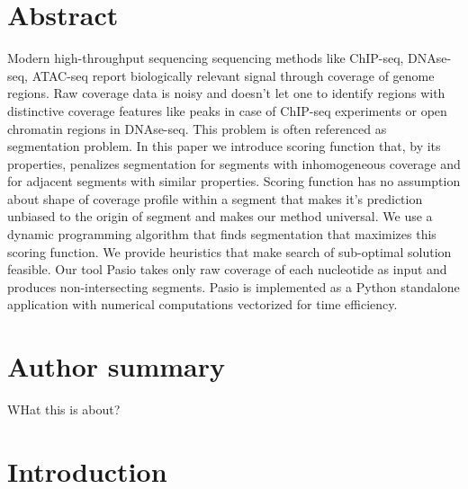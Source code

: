 \documentclass[10pt,letterpaper]{article}
\begin{document}
\section*{Abstract}
Modern high-throughput sequencing sequencing methods like ChIP-seq, DNAse-seq, ATAC-seq report biologically relevant signal
through coverage of genome regions. 
Raw coverage data is noisy and doesn't let one to identify regions with distinctive coverage features like peaks in case of ChIP-seq experiments or open chromatin regions in DNAse-seq. This problem is often referenced as segmentation problem.
In this paper we introduce scoring function that, by its properties,
penalizes segmentation for segments with inhomogeneous coverage and for adjacent segments with similar properties.
Scoring function has no assumption about shape of coverage profile within a segment that makes it's prediction unbiased to the origin of segment and
makes our method universal.
We use a dynamic programming algorithm that finds segmentation that maximizes this scoring function.
We provide heuristics that make search of sub-optimal solution feasible.
Our tool Pasio takes only raw coverage of each nucleotide as input and produces non-intersecting segments.
Pasio is implemented as a Python standalone application with numerical computations vectorized for time efficiency.  







\section*{Author summary}
WHat this is about?
\linenumbers

\section{Introduction}
\end{document}
